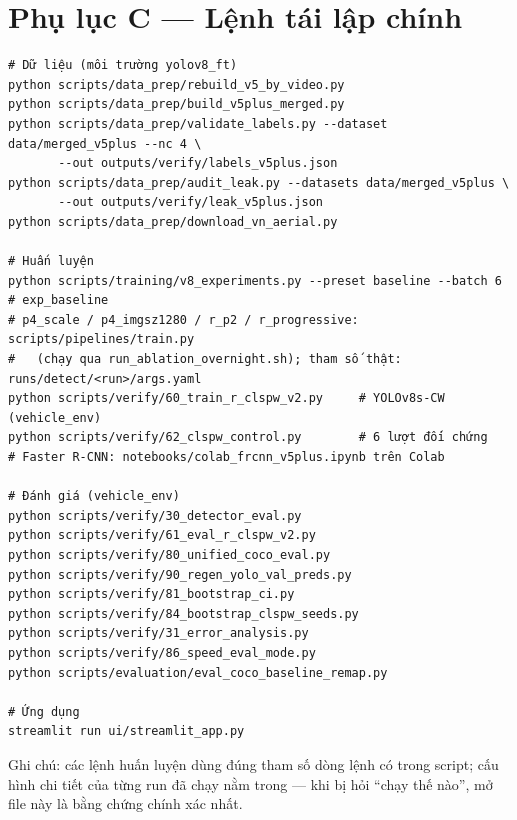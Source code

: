 \documentclass[11pt,a4paper]{article}
\newcommand{\f}[1]{\path{#1}}           %
\begin{document}
\section{Phụ lục C — Lệnh tái lập chính}
\begin{Verbatim}[fontsize=\footnotesize,formatcom=\sffamily,frame=single,framesep=6pt,rulecolor=\color{gray!50}]
# Dữ liệu (môi trường yolov8_ft)
python scripts/data_prep/rebuild_v5_by_video.py
python scripts/data_prep/build_v5plus_merged.py
python scripts/data_prep/validate_labels.py --dataset data/merged_v5plus --nc 4 \
       --out outputs/verify/labels_v5plus.json
python scripts/data_prep/audit_leak.py --datasets data/merged_v5plus \
       --out outputs/verify/leak_v5plus.json
python scripts/data_prep/download_vn_aerial.py

# Huấn luyện
python scripts/training/v8_experiments.py --preset baseline --batch 6     # exp_baseline
# p4_scale / p4_imgsz1280 / r_p2 / r_progressive: scripts/pipelines/train.py
#   (chạy qua run_ablation_overnight.sh); tham số thật: runs/detect/<run>/args.yaml
python scripts/verify/60_train_r_clspw_v2.py     # YOLOv8s-CW (vehicle_env)
python scripts/verify/62_clspw_control.py        # 6 lượt đối chứng
# Faster R-CNN: notebooks/colab_frcnn_v5plus.ipynb trên Colab

# Đánh giá (vehicle_env)
python scripts/verify/30_detector_eval.py
python scripts/verify/61_eval_r_clspw_v2.py
python scripts/verify/80_unified_coco_eval.py
python scripts/verify/90_regen_yolo_val_preds.py
python scripts/verify/81_bootstrap_ci.py
python scripts/verify/84_bootstrap_clspw_seeds.py
python scripts/verify/31_error_analysis.py
python scripts/verify/86_speed_eval_mode.py
python scripts/evaluation/eval_coco_baseline_remap.py

# Ứng dụng
streamlit run ui/streamlit_app.py
\end{Verbatim}
{\small Ghi chú: các lệnh huấn luyện dùng đúng tham số dòng lệnh có trong script; cấu hình chi tiết của từng run đã chạy nằm trong \f{runs/detect/<run>/args.yaml} — khi bị hỏi “chạy thế nào”, mở file này là bằng chứng chính xác nhất.}
\end{document}
